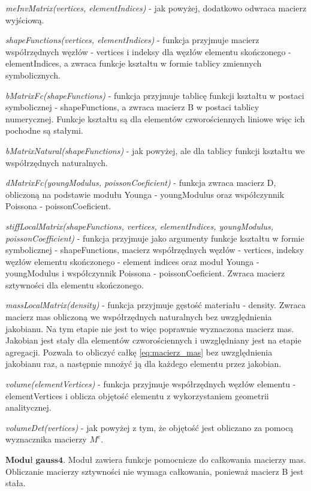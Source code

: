 \textit{meInvMatrix(vertices, elementIndices)} - jak powyżej, dodatkowo odwraca macierz wyjściową.

\textit{shapeFunctions(vertices, elementIndices)} - funkcja przyjmuje macierz współrzędnych węzłów - vertices i indeksy dla węzłów elementu skończonego - elementIndices, a zwraca funkcje kształtu w formie tablicy zmiennych symbolicznych.

\textit{bMatrixFc(shapeFunctions)} - funkcja przyjmuje tablicę funkcji kształtu w postaci symbolicznej - shapeFunctions, a zwraca macierz B w postaci tablicy numerycznej. Funkcje kształtu są dla elementów czworościennych liniowe więc ich pochodne są stałymi. 

\textit{bMatrixNatural(shapeFunctions)} - jak powyżej, ale dla tablicy funkcji kształtu we współrzędnych naturalnych.

\textit{dMatrixFc(youngModulus, poissonCoeficient)} - funkcja zwraca macierz D, obliczoną na podstawie modułu Younga - youngModulus oraz współczynnik Poissona - poissonCoeficient.

\textit{stiffLocalMatrix(shapeFunctions, vertices, elementIndices, youngModulus, poissonCoefficient)} - funkcja przyjmuje jako argumenty funkcje kształtu w formie symbolicznej - shapeFunctions, macierz współrzędnych węzłów - vertices, indeksy węzłów elementu skończonego - element indices oraz moduł Younga - youngModulus i współczynnik Poissona - poissonCoeficient. Zwraca macierz sztywności dla elementu skończonego.

\textit{massLocalMatrix(density)} - funkcja przyjmuje gęstość materiału - density. Zwraca macierz mas obliczoną we współrzędnych naturalnych bez uwzględnienia jakobianu. Na tym etapie nie jest to więc poprawnie wyznaczona macierz mas. Jakobian jest stały dla elementów czworościennych i uwzględniany jest na etapie agregacji. Pozwala to obliczyć całkę \ref{eq:macierz_mas} bez uwzględnienia jakobianu raz, a następnie mnożyć ją dla każdego elementu przez jakobian.

\textit{volume(elementVertices)} - funkcja przyjmuje współrzędnych węzłów elementu - elementVertices i oblicza objętość elementu z wykorzystaniem geometrii analitycznej.

\textit{volumeDet(vertices)} - jak powyżej z tym, że objętość jest obliczano za pomocą wyznacznika macierzy \( M^e \).

 \( \textbf{Moduł gauss4} \).
Moduł zawiera funkcje pomocnicze do całkowania macierzy mas. Obliczanie macierzy sztywności nie wymaga całkowania, ponieważ macierz B jest stała.

